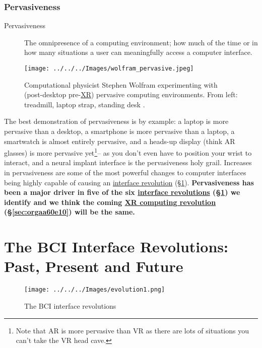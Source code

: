 \documentclass[logo,bsc,singlespacing,parskip]{infthesis}
\begin{document}
\subsection{Pervasiveness}
\label{sec:orgadfd161}
\medskip
\begin{mdframed}
\begin{description}
\item[{Pervasiveness\label{pervasiveness}}] The omnipresence of a computing environment; how much of the time or in how many situations a user can meaningfully access a computer interface.
\end{description}
\end{mdframed}

\begin{figure}[H]
\centering
\texttt{[image: ../../../Images/wolfram\_pervasive.jpeg]}
\caption[Stephen Wolfram experimenting with pervasive computing]{Computational physicist Stephen Wolfram experimenting with (post-desktop pre-\hyperref[org88b0f70]{XR}) pervasive computing environments. From left: treadmill, laptop strap, standing desk \autocite{SeekingProductiveLife}.}
\end{figure}

The best demonstration of pervasiveness is by example: a laptop is more pervasive than a desktop, a smartphone is more pervasive than a laptop, a smartwatch is almost entirely pervasive, and a heads-up display (think AR glasses) is more pervasive yet\footnote{Note that AR is more pervasive than VR as there are lots of situations you can't take the VR head cave.}-- as you don't even have to position your wrist to interact, and a neural implant interface is the pervasiveness holy grail.
Increases in pervasiveness are some of the most powerful changes to computer interfaces being highly capable of causing an \hyperref[sec:orgf9a6f3f]{interface revolution} (\S \ref{sec:orgf9a6f3f}).
\textbf{Pervasiveness has been a major driver in five of the six \hyperref[sec:orgf9a6f3f]{interface revolutions} (\S \ref{sec:orgf9a6f3f}) we identify and we think the coming \hyperref[sec:orgaa60e10]{XR computing revolution} (\S \ref{sec:orgaa60e10}) will be the same.}

\chapter{The BCI Interface Revolutions: Past, Present and Future}
\label{sec:orgf9a6f3f}
\setcounter{section}{-1}
\begin{figure}[h]
\centering
\texttt{[image: ../../../Images/evolution1.png]}
\caption{The BCI interface revolutions}
\end{figure}
\end{document}
